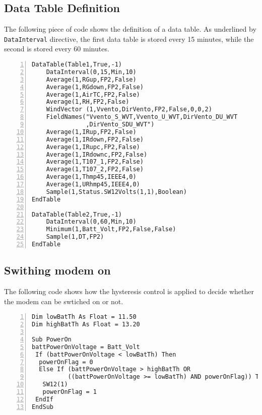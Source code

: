 \subsection{Data Table Definition}
The following piece of code shows the definition of a data table.
As underlined by {\tt DataInterval} directive, the first data table is stored every 15 minutes, while the second is stored every 60 minutes.
\begin{lstlisting}[numbers=left, breaklines=true]
DataTable(Table1,True,-1)
	DataInterval(0,15,Min,10)
	Average(1,RGup,FP2,False)
	Average(1,RGdown,FP2,False)
	Average(1,AirTC,FP2,False)
	Average(1,RH,FP2,False)
	WindVector (1,Vvento,DirVento,FP2,False,0,0,2)
	FieldNames("Vvento_S_WVT,Vvento_U_WVT,DirVento_DU_WVT
	           ,DirVento_SDU_WVT")
	Average(1,IRup,FP2,False)
	Average(1,IRdown,FP2,False)
	Average(1,IRupc,FP2,False)
	Average(1,IRdownc,FP2,False)
	Average(1,T107_1,FP2,False)
	Average(1,T107_2,FP2,False)
	Average(1,Thmp45,IEEE4,0)
	Average(1,URhmp45,IEEE4,0)
	Sample(1,Status.SW12Volts(1,1),Boolean)
EndTable

DataTable(Table2,True,-1)
	DataInterval(0,60,Min,10)
	Minimum(1,Batt_Volt,FP2,False,False)
	Sample(1,DT,FP2)
EndTable
\end{lstlisting}
\clearpage
\subsection{Swithing modem on}
The following code shows how the hysteresis control is applied to decide whether the modem can be swtiched on or not.
\begin{lstlisting}[numbers=left, breaklines=true]
Dim lowBatTh As Float = 11.50
Dim highBatTh As Float = 13.20

Sub PowerOn
battPowerOnVoltage = Batt_Volt
 If (battPowerOnVoltage < lowBatTh) Then
  powerOnFlag = 0
  Else If (battPowerOnVoltage > highBatTh OR 
          ((battPowerOnVoltage >= lowBatTh) AND powerOnFlag)) Then
   SW12(1)
   powerOnFlag = 1
 EndIf
EndSub
\end{lstlisting}
